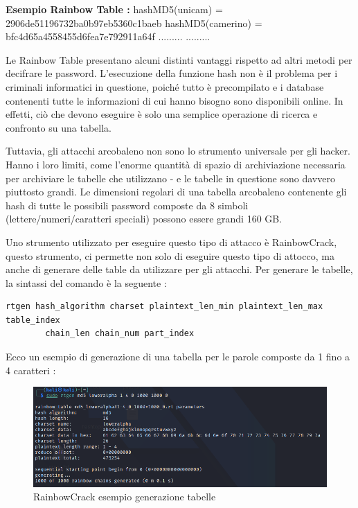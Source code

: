 \textbf{Esempio Rainbow Table :}
\newline
\newline
hashMD5(unicam) = 2906de51196732ba0b97eb5360c1baeb\newline
hashMD5(camerino) = bfc4d65a4558455d6fea7e792911a64f\newline
.........\newline
.........\newline

Le Rainbow Table presentano alcuni distinti vantaggi rispetto ad altri metodi per decifrare le password. L'esecuzione della funzione hash non è il problema per i criminali informatici in questione, poiché tutto è precompilato e i database contenenti tutte le informazioni di cui hanno bisogno sono disponibili online. In effetti, ciò che devono eseguire è solo una semplice operazione di ricerca e confronto su una tabella.

Tuttavia, gli attacchi arcobaleno non sono lo strumento universale per gli hacker. Hanno i loro limiti, come l'enorme quantità di spazio di archiviazione necessaria per archiviare le tabelle che utilizzano - e le tabelle in questione sono davvero piuttosto grandi. Le dimensioni regolari di una tabella arcobaleno contenente gli hash di tutte le possibili password composte da 8 simboli (lettere/numeri/caratteri speciali) possono essere grandi 160 GB.

Uno strumento utilizzato per eseguire questo tipo di attacco è RainbowCrack\cite{rainbowcrack}, questo strumento, ci permette non solo di eseguire questo tipo di attocco, ma anche di generare delle table da utilizzare per gli attacchi. Per generare le tabelle, la sintassi del comando è la seguente :

\begin{lstlisting}[caption={RainbowCrack generazione tabelle}, style=javaScriptCode]
rtgen hash_algorithm charset plaintext_len_min plaintext_len_max table_index 
        chain_len chain_num part_index
\end{lstlisting}

Ecco un esempio di generazione di una tabella per le parole composte da 1 fino a 4 caratteri :

\begin{figure}[h!]
    \centering
    \includegraphics[width=120mm]{Immagini/1/r_1.png}
    \caption{RainbowCrack esempio generazione tabelle}
\end{figure}

